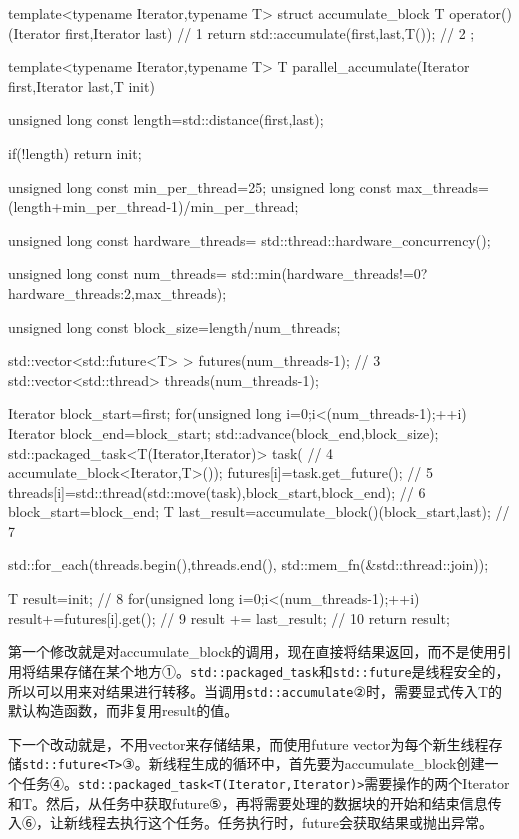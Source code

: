\begin{cpp}
template<typename Iterator,typename T>
struct accumulate_block
{
  T operator()(Iterator first,Iterator last)  // 1
  {
    return std::accumulate(first,last,T());  // 2
  }
};

template<typename Iterator,typename T>
T parallel_accumulate(Iterator first,Iterator last,T init)
{
  unsigned long const length=std::distance(first,last);

  if(!length)
    return init;

  unsigned long const min_per_thread=25;
  unsigned long const max_threads=
    (length+min_per_thread-1)/min_per_thread;

  unsigned long const hardware_threads=
    std::thread::hardware_concurrency();

  unsigned long const num_threads=
    std::min(hardware_threads!=0?hardware_threads:2,max_threads);

  unsigned long const block_size=length/num_threads;

  std::vector<std::future<T> > futures(num_threads-1);  // 3
  std::vector<std::thread> threads(num_threads-1);

  Iterator block_start=first;
  for(unsigned long i=0;i<(num_threads-1);++i)
  {
    Iterator block_end=block_start;
    std::advance(block_end,block_size);
    std::packaged_task<T(Iterator,Iterator)> task(  // 4
      accumulate_block<Iterator,T>());
    futures[i]=task.get_future();  // 5
    threads[i]=std::thread(std::move(task),block_start,block_end);  // 6
    block_start=block_end;
  }
  T last_result=accumulate_block()(block_start,last);  // 7

  std::for_each(threads.begin(),threads.end(),
    std::mem_fn(&std::thread::join));

  T result=init;  // 8
  for(unsigned long i=0;i<(num_threads-1);++i)
  {
    result+=futures[i].get();  // 9
  }
  result += last_result;  // 10
  return result;
}
\end{cpp}

第一个修改就是对accumulate\_block的调用，现在直接将结果返回，而不是使用引用将结果存储在某个地方①。\texttt{std::packaged\_task}和\texttt{std::future}是线程安全的，所以可以用来对结果进行转移。当调用\texttt{std::accumulate}②时，需要显式传入T的默认构造函数，而非复用result的值。

下一个改动就是，不用vector来存储结果，而使用future vector为每个新生线程存储\texttt{std::future<T>}③。新线程生成的循环中，首先要为accumulate\_block创建一个任务④。\texttt{std::packaged\_task<T(Iterator,Iterator)>}需要操作的两个Iterator和T。然后，从任务中获取future⑤，再将需要处理的数据块的开始和结束信息传入⑥，让新线程去执行这个任务。任务执行时，future会获取结果或抛出异常。

